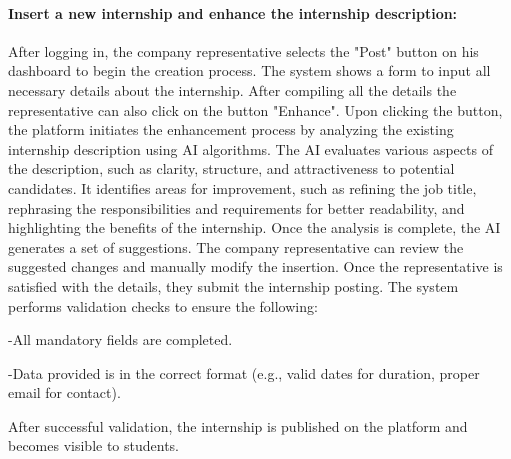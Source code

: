 \paragraph{Insert a new internship and enhance the internship
  description:} After logging in, the company representative selects the
  "Post" button on his dashboard to begin the creation process. The
  system shows a form to input all necessary details about the
  internship. After compiling all the details the representative can also 
  click on the button "Enhance". 
  Upon clicking the button, the platform initiates the enhancement process by analyzing the existing internship
  description using AI algorithms. The AI evaluates various aspects of
  the description, such as clarity, structure, and attractiveness to
  potential candidates. It identifies areas for improvement, such as
  refining the job title, rephrasing the responsibilities and
  requirements for better readability, and highlighting the benefits of
  the internship. Once the analysis is complete, the AI generates a set of
  suggestions. The company representative can review the suggested
  changes and manually modify the insertion.
  Once the representative is satisfied with the details, they submit the internship posting. The system performs validation checks to ensure the following:
  
  -All mandatory fields are completed.
  
  -Data provided is in the correct format (e.g., valid dates for duration, proper email for contact).
  
  After successful validation, the internship is published on the platform and becomes visible to students.


